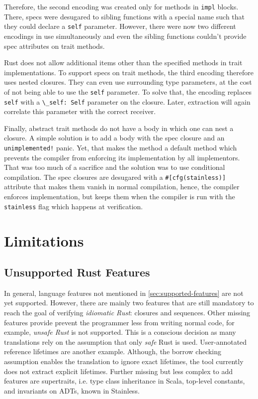 Therefore, the second encoding was created only for methods in \lstinline!impl!
blocks. There, specs were desugared to sibling functions with a special name
such that they could declare a \lstinline!self! parameter. However, there were
now two different encodings in use simultaneously and even the sibling functions
couldn't provide spec attributes on trait methods.

Rust does not allow additional items other than the specified methods in trait
implementations. To support specs on trait methods, the third encoding therefore
uses nested closures. They can even use surrounding type parameters, at the cost
of not being able to use the \lstinline!self! parameter. To solve that, the
encoding replaces \lstinline!self! with a \passthrough{\lstinline!\_self: Self!}
parameter on the closure. Later, extraction will again correlate this parameter
with the correct receiver.

Finally, abstract trait methods do not have a body in which one can nest a
closure. A simple solution is to add a body with the spec closure and an
\lstinline"unimplemented!" panic. Yet, that makes the method a default method
which prevents the compiler from enforcing its implementation by all
implementors. That  was too much of a sacrifice and the solution was to use
conditional compilation. The spec closures are desugared with a
\lstinline!#[cfg(stainless)]! attribute that makes them vanish in normal
compilation, hence, the compiler enforces implementation, but keeps them when
the compiler is run with the \lstinline!stainless! flag which happens at
verification.



\section{Limitations}
\label{impl-limitations}

\subsection{Unsupported Rust Features}

In general, language features not mentioned in \autoref{sec:supported-features}
are not yet supported. However, there are mainly two features that are still
mandatory to reach the goal of verifying \emph{idiomatic Rust}: closures and
sequences. Other missing features provide prevent the programmer less from
writing normal code, for example, \emph{unsafe Rust} is not supported. This is a
conscious decision as many translations rely on the assumption that only
\emph{safe} Rust is used. User-annotated reference lifetimes are another
example. Although, the borrow checking assumption enables the translation to
ignore exact lifetimes, the tool currently does not extract explicit lifetimes.
Further missing but less complex to add features are supertraits, i.e. type
class inheritance in Scala, top-level constants, and invariants on ADTs, known
in Stainless.

